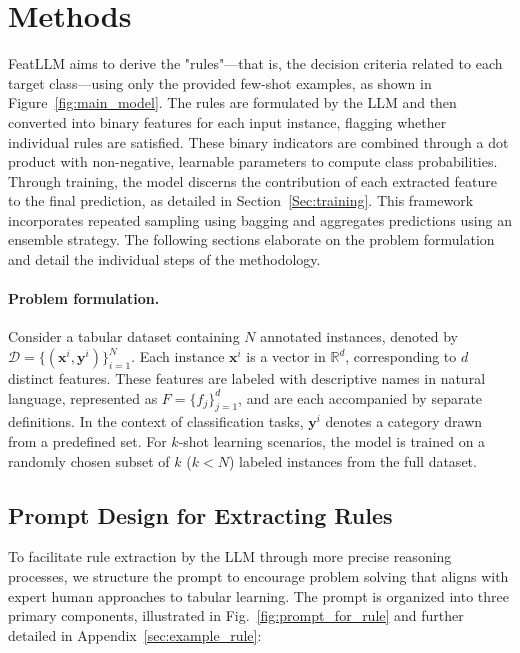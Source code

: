 \section{Methods}
\textsf{FeatLLM} aims to derive the "rules"—that is, the decision criteria related to each target class—using only the provided few-shot examples, as shown in Figure~\ref{fig:main_model}. The rules are formulated by the LLM and then converted into binary features for each input instance, flagging whether individual rules are satisfied. These binary indicators are combined through a dot product with non-negative, learnable parameters to compute class probabilities. Through training, the model discerns the contribution of each extracted feature to the final prediction, as detailed in Section~\ref{Sec:training}. This framework incorporates repeated sampling using bagging and aggregates predictions using an ensemble strategy. The following sections elaborate on the problem formulation and detail the individual steps of the methodology.

\vspace*{-0.12in}
\paragraph{Problem formulation.} Consider a tabular dataset containing $N$ annotated instances, denoted by $\mathcal{D} = \{(\mathbf{x}^i, \mathbf{y}^i)\}_{i=1}^{N}$. Each instance $\mathbf{x}^i$ is a vector in $\mathbb{R}^d$, corresponding to $d$ distinct features. These features are labeled with descriptive names in natural language, represented as $F = \{f_j\}_{j=1}^{d}$, and are each accompanied by separate definitions. In the context of classification tasks, $\mathbf{y}^i$ denotes a category drawn from a predefined set. For $k$-shot learning scenarios, the model is trained on a randomly chosen subset of $k$ ($k < N$) labeled instances from the full dataset.

\subsection{Prompt Design for Extracting Rules}
\label{Sec:prompt_design}
To facilitate rule extraction by the LLM through more precise reasoning processes, we structure the prompt to encourage problem solving that aligns with expert human approaches to tabular learning. The prompt is organized into three primary components, illustrated in Fig.~\ref{fig:prompt_for_rule} and further detailed in Appendix~\ref{sec:example_rule}:

